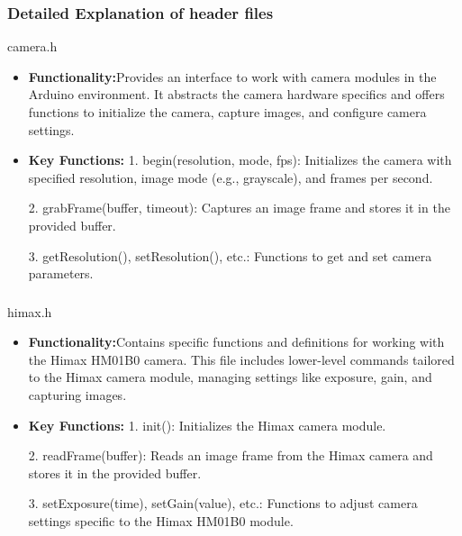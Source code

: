 \documentclass[10pt, a4paper]{beamer}
\begin{document}
	\begin{frame}
		\frametitle{Detailed Explanation of header files}
			\begin{block}{camera.h }
				
				\begin{itemize}
					\item \textbf{Functionality:}Provides an interface to work with camera modules in the Arduino environment. It abstracts the camera hardware specifics and offers functions to initialize the camera, capture images, and configure camera settings.
					\item \textbf{Key Functions: }
					1. begin(resolution, mode, fps): Initializes the camera with specified resolution, image mode (e.g., grayscale), and frames per second. 
					
					2. grabFrame(buffer, timeout): Captures an image frame and stores it in the provided buffer. 
					
					3. getResolution(), setResolution(), etc.: Functions to get and set camera parameters. 
				\end{itemize}
			\end{block}
		
	\end{frame}
	
	\begin{frame}
		\frametitle{}
		\begin{block}{himax.h }
			
			\begin{itemize}
				\item \textbf{Functionality:}Contains specific functions and definitions for working with the Himax HM01B0 camera. This file includes lower-level commands tailored to the Himax camera module, managing settings like exposure, gain, and capturing images.
				\item \textbf{Key Functions: }
				1. init(): Initializes the Himax camera module.  
				
				2. readFrame(buffer): Reads an image frame from the Himax camera and stores it in the provided buffer. 
				
				3. setExposure(time), setGain(value), etc.: Functions to adjust camera settings specific to the Himax HM01B0 module. 
			\end{itemize}
		\end{block}
		
	\end{frame}
	
\end{document}

